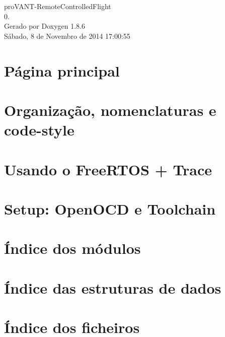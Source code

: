 \documentclass[twoside]{book}
\newcommand{\clearemptydoublepage}{%
  \newpage{\pagestyle{empty}\cleardoublepage}%
}
\begin{document}
\hypersetup{pageanchor=false}
\begin{titlepage}
\vspace*{7cm}
\begin{center}%
{\Large pro\-V\-A\-N\-T-\/\-Remote\-Controlled\-Flight \\[1ex]\large 0. }\\
\vspace*{1cm}
{\large Gerado por Doxygen 1.8.6}\\
\vspace*{0.5cm}
{\small Sábado, 8 de Novembro de 2014 17:00:55}\\
\end{center}
\end{titlepage}
\clearemptydoublepage
\tableofcontents
\clearemptydoublepage
{}
\hypersetup{pageanchor=true}

\chapter{Página principal}
\label{index}\hypertarget{index}{}
\chapter{Organização, nomenclaturas e code-\/style}
\label{page_naming}
\hypertarget{page_naming}{}

\chapter{Usando o Free\-R\-T\-O\-S + Trace}
\label{page_freertosplustrace}
\hypertarget{page_freertosplustrace}{}

\chapter{Setup\-: Open\-O\-C\-D e Toolchain}
\label{page_setup}
\hypertarget{page_setup}{}

\chapter{Índice dos módulos}

\chapter{Índice das estruturas de dados}

\chapter{Índice dos ficheiros}

\end{document}

